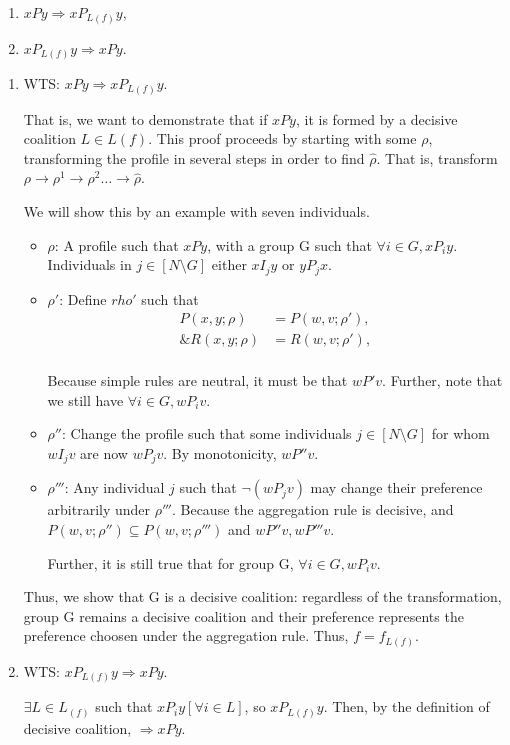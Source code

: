 \documentclass{article}
\begin{document}
\begin{enumerate}

\item $xPy \Rightarrow xP_{L(f)}y$,
\item $ xP_{L(f)}y \Rightarrow xPy$.
\end{enumerate}
\bigskip
\begin{enumerate}

\item WTS:  $xPy \Rightarrow xP_{L(f)}y$.

That is, we want to demonstrate that if $xPy$, it is formed by a decisive coalition $L \in L(f)$. This proof proceeds by starting with some $\rho$, transforming the profile in several steps in order to find $\hat{\rho} $. That is, transform $\rho \to \rho^1 \to \rho^2 \dots \to \hat{\rho} $.

We will show this by an example with seven individuals.

\begin{itemize}

\item $\rho$: A profile such that $xPy$, with a group G such that $\forall i \in G, xP_iy$. Individuals in $j \in [N\setminus G]$ either $xI_jy$ or $yP_jx$.

\item $\rho'$: Define $rho'$ such that 
\begin{align*}
P(x,y;\rho) &= P(w,v; \rho'),\\
\&R(x,y;\rho) &= R(w,v; \rho'),\\
\end{align*}

Because simple rules are neutral, it must be that $wP'v$. Further, note that we still have $\forall i \in G, wP_iv$.

\item $\rho''$: Change the profile such that some individuals  $j \in [N\setminus G]$ for whom $wI_jv$ are now $wP_jv$. By monotonicity, $wP''v$.


\item $\rho'''$: Any individual $j$ such that $\neg(wP_jv)$ may change their preference arbitrarily under $\rho'''$. Because the aggregation rule is decisive, and $P(w,v; \rho'') \subseteq P(w,v; \rho''')$ and $wP''v, wP'''v$.

Further, it is still true that for group G, $\forall i \in G, wP_iv$. 

\end{itemize}

Thus, we show that G is a decisive coalition: regardless of the transformation, group G remains a decisive coalition and their preference represents the preference choosen under the aggregation rule. Thus, $f = f_{L(f)} $.



\item WTS:  $ xP_{L(f)}y \Rightarrow xPy$.

$\exists L \in L_{(f)}$ such that $xP_iy [\forall i \in L]$, so $xP_{L(f)}y$. Then, by the definition of decisive coalition, $\Rightarrow xPy$.

\end{enumerate}
\end{document}
